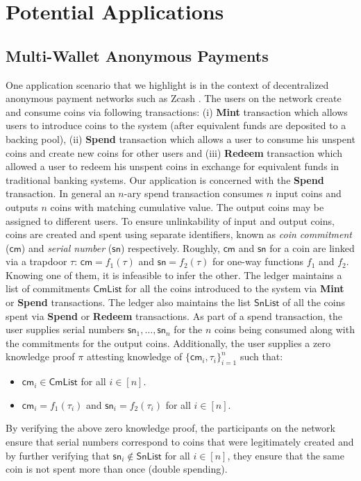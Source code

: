 \section{Potential Applications}
\subsection{Multi-Wallet Anonymous Payments}\label{sec:application1}
One application scenario that we highlight is in the context of decentralized anonymous payment networks such as Zcash \cite{zerocash}. 
The users on the network create and consume coins via following transactions: (i) {\bf Mint} transaction which allows users to introduce coins to the system (after equivalent funds are
deposited to a backing pool), (ii) {\bf Spend} transaction which allows a user to consume his unspent coins and create new coins for other users and 
(iii) {\bf Redeem} transaction which allowed a user to redeem his unspent coins in exchange for equivalent funds in traditional banking systems. Our application 
is concerned with the {\bf Spend} transaction. In general an $n$-ary spend transaction consumes $n$ input coins and outputs $n$ coins with matching 
cumulative value. The output coins may be assigned to different users. To ensure unlinkability of input and output coins, coins are created
and spent using separate identifiers, known as {\em coin commitment} ($\mathsf{cm}$) and {\em serial number} ($\mathsf{sn}$) respectively. 
Roughly, $\mathsf{cm}$
and $\mathsf{sn}$ for a coin are linked via a trapdoor $\tau$: $\mathsf{cm} = f_1(\tau)$ and $\mathsf{sn}=f_2(\tau)$ for one-way functions
$f_1$ and $f_2$. Knowing one of them, it is infeasible to infer the other.  
The ledger maintains a list of commitments $\mathsf{CmList}$ for all the coins introduced to the system via {\bf Mint} or {\bf Spend} transactions. 
The ledger also maintains the list $\mathsf{SnList}$ of all the coins spent via {\bf Spend} or {\bf Redeem} transactions. As part of a spend transaction, 
the user supplies serial numbers $\mathsf{sn}_1,\ldots,\mathsf{sn}_n$ for the $n$ coins being consumed along with the commitments for the output coins.
 Additionally, the 
user supplies a zero knowledge proof $\pi$ attesting knowledge of $\{\mathsf{cm}_i,\tau_i\}_{i=1}^n$ such that:
\begin{itemize}
    \item $\mathsf{cm}_i\in \mathsf{CmList}$ for all $i\in [n]$.
    \item $\mathsf{cm}_i=f_1(\tau_i)$ and $\mathsf{sn}_i=f_2(\tau_i)$ for all $i\in [n]$.
\end{itemize}
By verifying the above zero knowledge proof, the participants on the network ensure that serial numbers correspond to coins that were legitimately 
created and by further verifying that $\mathsf{sn}_i\not\in \mathsf{SnList}$ for all $i\in [n]$, they ensure that the same coin is not 
spent more than once (double spending).

